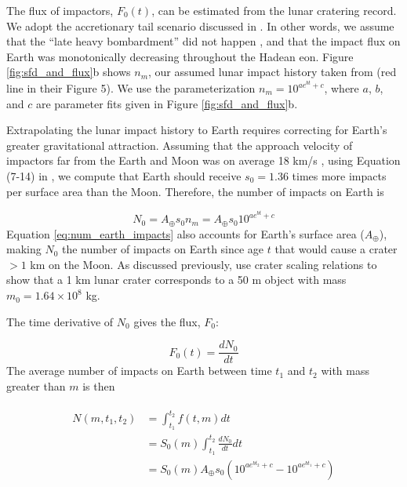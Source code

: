 \documentclass{aastex631}
\begin{document}
The flux of impactors, $F_0(t)$, can be estimated from the lunar cratering record. We adopt the accretionary tail scenario discussed in \citet{Morbidelli_2018}. In other words, we assume that the ``late heavy bombardment'' did not happen \citep{Cartwright_2022,Hartmann_2019,Zellner_2017}, and that the impact flux on Earth was monotonically decreasing throughout the Hadean eon. Figure \ref{fig:sfd_and_flux}b shows $n_m$, our assumed lunar impact history taken from \citet{Morbidelli_2018} (red line in their Figure 5). We use the parameterization $n_m = 10^{a e^{b t} + c}$, where $a$, $b$, and $c$ are parameter fits given in Figure \ref{fig:sfd_and_flux}b.

Extrapolating the lunar impact history to Earth requires correcting for Earth's greater gravitational attraction. Assuming that the approach velocity of impactors far from the Earth and Moon was on average 18 km/s \citep{Morbidelli_2018}, using Equation (7-14) in \citet{Zahnle_2006}, we compute that Earth should receive $s_0 = 1.36$ times more impacts per surface area than the Moon. Therefore, the number of impacts on Earth is

\begin{equation}
  N_0 = A_\oplus s_0 n_m = A_\oplus s_0 10^{a e^{b t} + c}
  \label{eq:num_earth_impacts}
\end{equation}
Equation \eqref{eq:num_earth_impacts} also accounts for Earth's surface area ($A_\oplus$), making $N_0$ the number of impacts on Earth since age $t$ that would cause a crater $> 1$ km on the Moon. As discussed previously, \citet{Morbidelli_2018} use crater scaling relations to show that a 1 km lunar crater corresponds to a 50 m object with mass $m_0 = 1.64 \times 10^8$ kg.

The time derivative of $N_0$ gives the flux, $F_0$:

\begin{equation}
  F_0(t) = \frac{d N_0}{dt}
\end{equation}
The average number of impacts on Earth between time $t_1$ and $t_2$ with mass greater than $m$ is then

\begin{align}
\begin{split}
  N(m,t_1,t_2) &= \int_{t_1}^{t_2} f(t,m) dt \\
  &= S_0(m) \int_{t_1}^{t_2} \frac{d N_0}{dt} dt \\
  &= S_0(m) A_\oplus s_0 \left( 10^{a e^{b t_2} + c} - 10^{a e^{b t_1} + c} \right)
\end{split}
\end{align}
\end{document}
